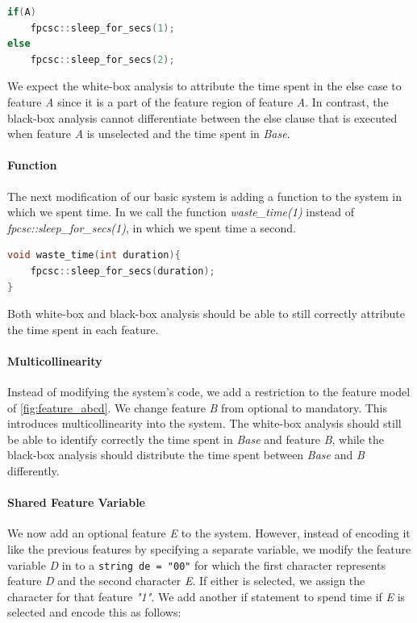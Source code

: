 \begin{minipage}{\linewidth}
    \begin{lstlisting}[language=C++,label={lst:else_case},escapechar=|]
if(A)
    fpcsc::sleep_for_secs(1); 
else
    fpcsc::sleep_for_secs(2);
    \end{lstlisting}
    \end{minipage}

We expect the white-box analysis to attribute the time spent in the else case to feature \emph{A} 
since it is a part of the feature region of feature \emph{A}. 
In contrast, 
the black-box analysis cannot differentiate between the else clause that is executed when feature \emph{A} is unselected and the time spent in \emph{Base}.

\paragraph{Function}\label{ground-truth:Function}
The next modification of our basic system is adding a function to the system in which we spent time. 
In  we call the function \emph{waste\_time(1)} instead of \emph{fpcsc::sleep\_for\_secs(1)}, in which we spent time a second.

\begin{minipage}{\linewidth}
\begin{lstlisting}[language=C++,label={lst:function},escapechar=|]
void waste_time(int duration){
    fpcsc::sleep_for_secs(duration);
}
\end{lstlisting}
\end{minipage}

Both white-box and black-box analysis should be able to still correctly attribute the time spent in each feature.

\paragraph{Multicollinearity}\label{ground-truth:Multicollinearity}
Instead of modifying the system's code, we add a restriction to the feature model of \autoref{fig:feature_abcd}. 
We change feature \emph{B} from optional to mandatory. This introduces multicollinearity into the system. 
The white-box analysis should still be able to identify correctly the time spent in \emph{Base} and feature \emph{B}, 
while the black-box analysis should distribute the time spent between \emph{Base} and \emph{B} differently.

\paragraph{Shared Feature Variable}\label{ground-truth:Shared}
We now add an optional feature \emph{E} to the system. 
However, instead of encoding it like the previous features by specifying a separate variable, 
we modify the feature variable \emph{D} in  to a \texttt{string de = "00"} 
for which the first character represents feature \emph{D} and the second character \emph{E}. If either is selected, 
we assign the character for that feature \emph{"1"}. We add another if statement to spend time if \emph{E} is selected and encode this as follows:


